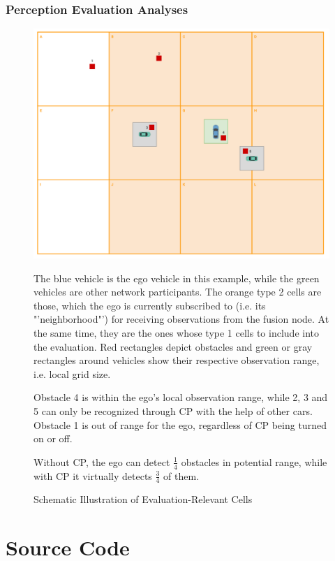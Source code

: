 \subsection{Perception Evaluation Analyses}
\label{subsec:appendix:texts:evaluation:perception_relevant_analyses}
\begin{figure}
	\includegraphics[width=1\linewidth]{98_images/grid_evaluation}
	\caption{Schematic Illustration of Evaluation-Relevant Cells}
	\label{fig:eval_relevant_cells}
	\medskip
	\small
	The blue vehicle is the ego vehicle in this example, while the green vehicles are other network participants. The orange type 2 cells are those, which the ego is currently subscribed to (i.e. its "'neighborhood"') for receiving observations from the fusion node. At the same time, they are the ones whose type 1 cells to include into the evaluation. Red rectangles depict obstacles and green or gray rectangles around vehicles show their respective observation range, i.e. local grid size.
	
	Obstacle 4 is within the ego's local observation range, while 2, 3 and 5 can only be recognized through CP with the help of other cars. Obstacle 1 is out of range for the ego, regardless of CP being turned on or off.
	
	Without CP, the ego can detect $\frac{1}{4}$ obstacles in potential range, while with CP it virtually detects $\frac{3}{4}$ of them.
\end{figure}

\chapter{Source Code}
\label{appendix:source_code}

